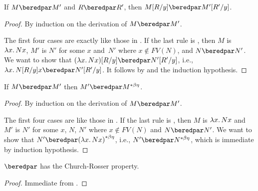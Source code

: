 \documentclass[../../../include/open-logic-section]{subfiles}
\begin{document}
\begin{lem}
  If $M \beredpar M'$ and $R \beredpar R'$, then $\Subst{M}{R}{y}
  \beredpar \Subst{M'}{R'}{y}$.
\end{lem}

\begin{proof}
  By induction on the derivation of $M \beredpar M'$.

  The first four cases are exactly like those in .
  If the last rule is , then $M$ is
  $\lambd[x][Nx]$, $M'$ is $N'$ for some $x$ and~$N'$ where $x \notin
  FV(N)$, and $N \beredpar N'$. We want to show that
  $\Subst{(\lambd[x][Nx])}{R}{y} \beredpar \Subst{N'}{R'}{y}$, i.e.,
  $\lambd[x][\Subst{N}{R}{y} x] \beredpar \Subst{N'}{R'}{y}$. It
  follows by  and the
  induction hypothesis.
\end{proof}

\begin{lem}
  If $M \beredpar M'$ then $M' \beredpar \becd{M}$.
\end{lem}

\begin{proof}
  By induction on the derivation of $M \beredpar M'$.

  The first four cases are like those in . If the
  last rule is , then $M$ is $\lambd[x][Nx]$ and
  $M'$ is $N'$ for some $x$, $N$, $N'$ where $x \notin FV(N)$ and $N
  \beredpar N'$. We want to show that $N' \beredpar
  \becd{(\lambd[x][Nx])}$, i.e., $N' \beredpar \becd{N}$, which is
  immediate by induction hypothesis.
\end{proof}

\begin{thm}
  $\beredpar$ has the Church-Rosser property.
\end{thm}

\begin{proof}
  Immediate from .
\end{proof}
\end{document}
